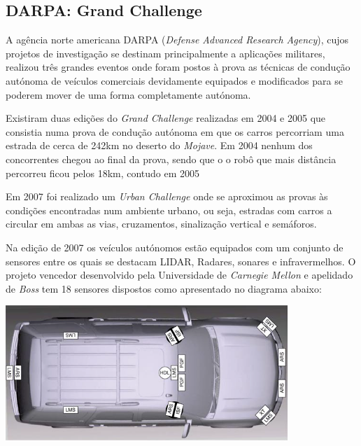 \subsection{DARPA: Grand Challenge}
A agência norte americana DARPA (\emph{Defense Advanced Research Agency}), cujos projetos de
investigação se destinam principalmente a aplicações militares, realizou três grandes
eventos onde foram postos à prova as técnicas de condução autónoma de veículos
comerciais devidamente equipados e modificados para se poderem mover de uma forma
completamente autónoma.  

Existiram duas edições do \emph{Grand Challenge} realizadas em 2004 e 2005 que consistia
numa prova de condução autónoma em que os carros percorriam uma estrada de cerca
de 242km no deserto do \emph{Mojave}. Em 2004 nenhum dos concorrentes chegou ao final da
prova, sendo que o o robô que mais distância percorreu ficou pelos 18km, contudo em 2005

Em 2007 foi realizado um \emph{Urban Challenge} onde se aproximou as provas às condições
encontradas num ambiente urbano, ou seja, estradas com carros a circular em ambas as
vias, cruzamentos, sinalização vertical  e semáforos.

Na edição de 2007 os veículos autónomos estão equipados com um conjunto de sensores
 entre os quais se destacam LIDAR, Radares, sonares e infravermelhos. O projeto
vencedor desenvolvido pela Universidade de \emph{Carnegie Mellon} e apelidado de
 \emph{Boss} \cite{Urmson:2008:ADU:1395073.1395077} tem
18 sensores dispostos como apresentado no diagrama abaixo:

\begin{center}
	\includegraphics[width=0.80\textwidth]{./figures/boss_sensors.png}
	\label{fig:2}
\end{center}

